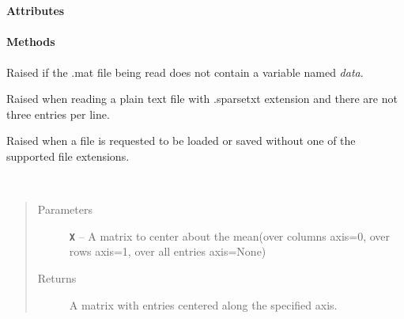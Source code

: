 \documentclass[letterpaper,10pt,english]{sphinxmanual}
\begin{document}

\begin{fulllineitems}
\label{loader:loader.IndexVector}~\paragraph{Attributes}
\paragraph{Methods}

\end{fulllineitems}


\begin{fulllineitems}
\label{loader:loader.Mat_format_error}
Raised if the .mat file being read does not contain a
variable named \emph{data}.

\end{fulllineitems}


\begin{fulllineitems}
\label{loader:loader.Sparse_format_error}
Raised when reading a plain text file with .sparsetxt
extension and there are not three entries per line.

\end{fulllineitems}


\begin{fulllineitems}
\label{loader:loader.Unsupported_format_error}
Raised when a file is requested to be loaded or saved without one of the supported file extensions.

\end{fulllineitems}


\begin{fulllineitems}
\label{loader:loader.center}~\begin{quote}\begin{description}
\item[{Parameters}] \leavevmode
\textbf{\texttt{X}} -- A matrix to center about the mean(over columns axis=0, over rows axis=1, over all entries axis=None)

\item[{Returns}] \leavevmode
A matrix with entries centered along the specified axis.

\end{description}\end{quote}

\end{fulllineitems}
\end{document}
